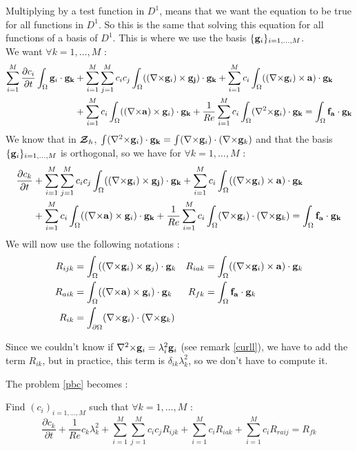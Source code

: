 Multiplying by a test function in $D^1$, means that we want the equation to be true for all functions in $D^1$. So this is the same that solving this equation for all functions of a basis of $D^1$. This is where we use the basis $\{{\mathbf{g}}_i\}_{i=1,\dots,M}$.\\
We want $\forall k=1,\dots,M$ :
\begin{align*}
\sum_{i=1}^M\frac{\partial c_i}{\partial t}\int_\Omega\mathbf{g}_i\cdot\mathbf{g_k} &+ \sum_{i=1}^M\sum_{j=1}^Mc_ic_j\int_\Omega(({\nabla\times}\mathbf{g}_i)\times \mathbf{g_j})\cdot\mathbf{g_k} + \sum_{i=1}^Mc_i\int_\Omega(({\nabla\times}\mathbf{g}_i)\times \mathbf{a})\cdot\mathbf{g_k}\\
& +  \sum_{i=1}^Mc_i\int_\Omega(({\nabla\times}\mathbf{a})\times \mathbf{g}_i)\cdot\mathbf{g_k} +\frac{1}{Re}\sum_{i=1}^Mc_i\int_\Omega({\nabla^2\times}\mathbf{g}_i)\cdot\mathbf{g_k} = \int_\Omega\mathbf{f_a}\cdot\mathbf{g_k}\\
\end{align*}
We know that in ${\bm{\mathcal{Z}}}_h$, $\int({\nabla^2\times}{\mathbf{g}}_i)\cdot{\mathbf{g_k}}=\int({\nabla\times}{\mathbf{g}}_i)\cdot({\nabla\times}{\mathbf{g}}_k)$ and that the basis $\{{\mathbf{g}}_i\}_{i=1,\dots,M}$ is orthogonal, so we have for $\forall k=1,\dots,M$ :
\begin{align*}
  \frac{\partial c_k}{\partial t} &+ \sum_{i=1}^M\sum_{j=1}^Mc_ic_j\int_\Omega(({\nabla\times}\mathbf{g}_i)\times \mathbf{g_j})\cdot\mathbf{g_k} + \sum_{i=1}^Mc_i\int_\Omega(({\nabla\times}\mathbf{g}_i)\times \mathbf{a})\cdot\mathbf{g_k}\\
  &+  \sum_{i=1}^Mc_i\int_\Omega(({\nabla\times}\mathbf{a})\times \mathbf{g}_i)\cdot\mathbf{g_k} + \frac{1}{Re}\sum_{i=1}^M c_i\int_\Omega({\nabla\times}{\mathbf{g}}_i)\cdot({\nabla\times}{\mathbf{g}}_k) = \int_\Omega\mathbf{f_a}\cdot\mathbf{g_k}
\end{align*}
We will now use the following notations :
\begin{align*}
  R_{ijk} &= \int_\Omega(({\nabla\times}\mathbf{g}_i)\times \mathbf{g}_j)\cdot\mathbf{g}_k & R_{iak} &= \int_\Omega(({\nabla\times}\mathbf{g}_i)\times \mathbf{a})\cdot\mathbf{g}_k\\
  R_{aik} &= \int_\Omega(({\nabla\times}\mathbf{a})\times \mathbf{g}_i)\cdot\mathbf{g}_k & R_{fk} &= \int_\Omega\mathbf{f_a}\cdot\mathbf{g}_k\\
  R_{ik} &= \int_{\partial\Omega} ({\nabla\times}{\mathbf{g}}_i)\cdot({\nabla\times}{\mathbf{g}}_k)
\end{align*}
\begin{rk}
  Since we couldn't know if ${\nabla^2\times}{\mathbf{g}}_i=\lambda^2_i {\mathbf{g}}_i$ (see remark \ref{curll}), we have to add the term $R_{ik}$, but in practice, this term is $\delta_{ik}\lambda^2_k$, so we don't have to compute it.
\end{rk}
The problem \ref{pbc} becomes :
\begin{pb}\label{fvc}
Find $(c_i)_{i=1,\dots,M}$ such that $\forall k=1,\dots,M$ :
\begin{equation*}
\frac{\partial c_k}{\partial t} + \frac{1}{Re}c_k\lambda_k^2 + \sum_{i=1}^M\sum_{j=1}^Mc_ic_jR_{ijk} + \sum_{i=1}^Mc_iR_{iak} + \sum_{i=1}^Mc_iR_{raij} = R_{fk}
\end{equation*}\end{pb}

